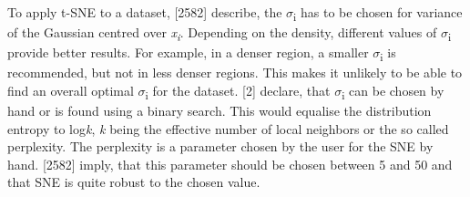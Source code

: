 To apply t-SNE to a dataset, \textcite{maaten2008visualizing}[2582] describe, the $\sigma$\textsubscript{i} has to be chosen for variance of the Gaussian centred over \textit{x\textsubscript{i}}. Depending on the density, different values of $\sigma$\textsubscript{i} provide better results. For example, in a denser region, a smaller $\sigma$\textsubscript{i} is recommended, but not in less denser regions. This makes it unlikely to be able to find an overall optimal  $\sigma$\textsubscript{i} for the dataset. \textcite{hinton2003stochastic}[2] declare, that $\sigma$\textsubscript{i} can be chosen by hand or is found using a binary search. This would equalise the distribution entropy to log\textit{k}, \textit{k} being the effective number of local neighbors or the so called perplexity. The perplexity is a parameter chosen by the user for the SNE by hand. \textcite{maaten2008visualizing}[2582] imply, that this parameter should be chosen between 5 and 50 and that SNE is quite robust to the chosen value. 





